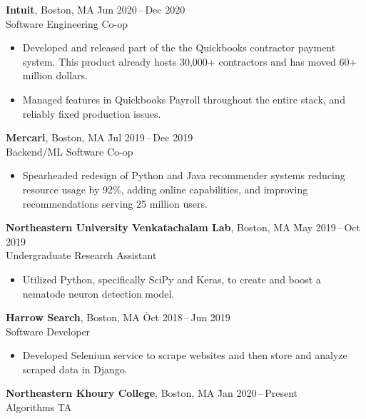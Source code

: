 \documentclass[11pt]{article}
\begin{document}
\begin{samepage}
\begin{tabbing}
  \textbf{Intuit}, Boston, MA \` Jun 2020\,--\,Dec 2020 \\
  Software Engineering Co-op
\end{tabbing}
\begin{itemize}
  \item{Developed and released part of the the Quickbooks contractor payment system.
  This product already hosts 30,000+ contractors and has moved 60+ million dollars.}
  \item{Managed features in Quickbooks Payroll throughout the entire
  stack, and reliably fixed production issues.}
\end{itemize}

\begin{tabbing}
  \textbf{Mercari}, Boston, MA \` Jul 2019\,--\,Dec 2019 \\
  Backend/ML Software Co-op
\end{tabbing}
\begin{itemize}
  \item Spearheaded redesign of Python and Java recommender systems reducing resource usage by 92\%, adding online capabilities, and improving recommendations serving 25 million users.
\end{itemize}

\begin{tabbing}
  \textbf{Northeastern University Venkatachalam Lab}, Boston, MA \` May 2019\,--\,Oct 2019 \\
  Undergraduate Research Assistant
\end{tabbing}
\begin{itemize}
  \item Utilized Python, specifically SciPy and Keras, to create and boost a nematode neuron detection model.
\end{itemize}

\begin{tabbing}
  \textbf{Harrow Search}, Boston, MA \` Oct 2018\,--\,Jun 2019 \\
  Software Developer
\end{tabbing}
\begin{itemize}
  \item Developed Selenium service to scrape websites and then store and analyze scraped data in Django.
\end{itemize}

\begin{tabbing}
  \textbf{Northeastern Khoury College}, Boston, MA \` Jan 2020\,--\,Present \\
  Algorithms TA
\end{tabbing}



\end{samepage}
\end{document}
